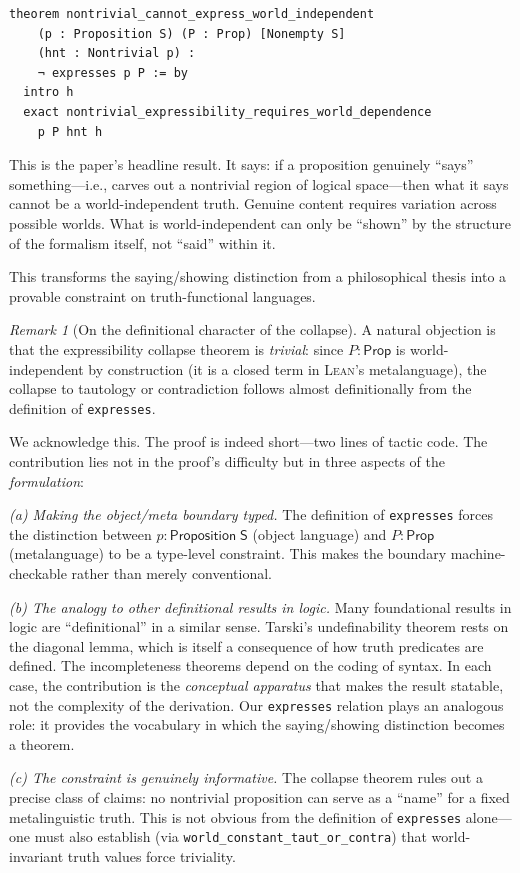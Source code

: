 \documentclass[10pt, letterpaper]{article}
\theoremstyle{definition}
\theoremstyle{remark}
\newtheorem{remark}[theorem]{Remark}
\newcommand{\Sach}{\mathsf{S}}
\newcommand{\Prop}{\mathsf{Prop}}
\newcommand{\Lean}{\textsc{Lean}}
\begin{document}
\begin{lstlisting}
theorem nontrivial_cannot_express_world_independent
    (p : Proposition S) (P : Prop) [Nonempty S]
    (hnt : Nontrivial p) :
    ¬ expresses p P := by
  intro h
  exact nontrivial_expressibility_requires_world_dependence
    p P hnt h
\end{lstlisting}

\noindent
This is the paper's headline result.  It says: if a proposition
genuinely ``says'' something---i.e., carves out a nontrivial
region of logical space---then what it says cannot be a
world-independent truth.  Genuine content requires variation
across possible worlds.  What is world-independent can only be
``shown'' by the structure of the formalism itself, not ``said''
within it.

This transforms the saying/showing distinction from a
philosophical thesis into a provable constraint on
truth-functional languages.

\begin{remark}[On the definitional character of the collapse]
\label{rem:triviality}
A natural objection is that the expressibility collapse theorem
is \emph{trivial}: since $P : \Prop$ is world-independent by
construction (it is a closed term in \Lean's metalanguage), the
collapse to tautology or contradiction follows almost
definitionally from the definition of \texttt{expresses}.

We acknowledge this.  The proof is indeed short---two lines of
tactic code.  The contribution lies not in the proof's
difficulty but in three aspects of the \emph{formulation}:

\emph{(a) Making the object/meta boundary typed.}  The
definition of \texttt{expresses} forces the distinction between
$p : \mathsf{Proposition}\;\Sach$ (object language) and
$P : \Prop$ (metalanguage) to be a type-level constraint.  This
makes the boundary machine-checkable rather than merely
conventional.

\emph{(b) The analogy to other definitional results in logic.}
Many foundational results in logic are ``definitional'' in
a similar sense.  Tarski's undefinability theorem rests on the
diagonal lemma, which is itself a consequence of how truth
predicates are defined.  The incompleteness theorems depend on
the coding of syntax.  In each case, the contribution is the
\emph{conceptual apparatus} that makes the result statable, not
the complexity of the derivation.  Our \texttt{expresses}
relation plays an analogous role: it provides the vocabulary in
which the saying/showing distinction becomes a theorem.

\emph{(c) The constraint is genuinely informative.}
The collapse theorem rules out a precise class of claims:
no nontrivial proposition can serve as a ``name'' for a fixed
metalinguistic truth.  This is not obvious from the definition
of \texttt{expresses} alone---one must also establish
(via \texttt{world\_constant\_taut\_or\_contra}) that
world-invariant truth values force triviality.
\end{remark}
\end{document}
